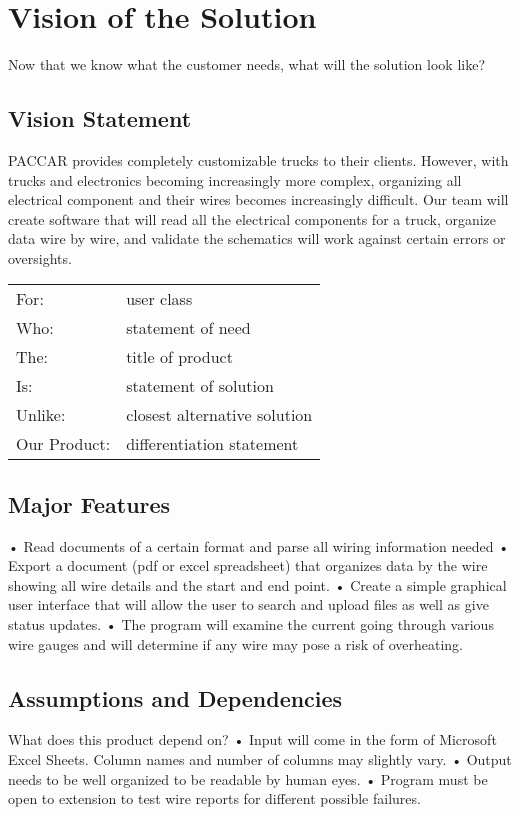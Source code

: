 \section{Vision of the Solution}
Now that we know what the customer needs, 
what will the solution look like? 
\subsection{Vision Statement}
    PACCAR provides completely customizable trucks to their clients. However, with trucks and electronics becoming increasingly more complex, organizing all electrical component and their wires becomes increasingly difficult. Our team will create software that will read all the electrical components for a truck, organize data wire by wire, and validate the schematics will work against certain errors or oversights.  
 \begin{tabular}{ll}
 For:         &user class\\
 Who:         &statement of need\\
 The:         &title of product\\
 Is:          &statement of solution\\
 Unlike:      &closest alternative solution\\
 Our Product: &differentiation statement  \\
 \end{tabular}  
\subsection{Major Features}

•	Read documents of a certain format and parse all wiring information needed
•	Export a document (pdf or excel spreadsheet) that organizes data by the wire showing all wire details and the start and end point.
•	Create a simple graphical user interface that will allow the user to search and upload files as well as give status updates.
•	The program will examine the current going through various wire gauges and will determine if any wire may pose a risk of overheating.

\subsection{Assumptions and Dependencies}
 What does this product depend on?  
•	Input will come in the form of Microsoft Excel Sheets. Column names and number of columns may slightly vary. 
•	Output needs to be well organized to be readable by human eyes. 
•	Program must be open to extension to test wire reports for different possible failures.


